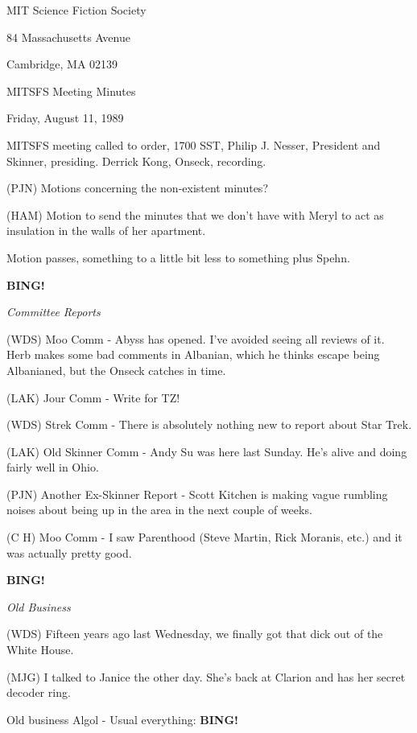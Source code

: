 \documentclass[12pt]{article}
\newcommand{\bing}{{\bf BING!} }
\newcommand{\goto}[1]{\bing \vskip 12pt \centerline{{\em{#1}}}}
\begin{document}
\begin{center}

MIT Science Fiction Society 

84 Massachusetts Avenue

Cambridge, MA 02139

\vspace{12pt}

MITSFS Meeting Minutes 

Friday, August 11, 1989

\end{center}
 
\vspace{18pt}

\setlength{\parskip}{6pt}

\noindent
MITSFS meeting called to order, 1700 SST, Philip J. Nesser, President and Skinner, presiding. Derrick Kong, Onseck, recording.

(PJN) Motions concerning the non-existent minutes?

(HAM) Motion to send the minutes that we don't have with Meryl to act as insulation in the walls of her apartment.

Motion passes, something to a little bit less to something plus Spehn.

\goto{Committee Reports}

(WDS) Moo Comm - Abyss has opened.  I've avoided seeing all reviews of it. Herb makes some bad comments in Albanian, which he thinks escape being Albanianed, but the Onseck catches in time.

(LAK) Jour Comm - Write for TZ!

(WDS) Strek Comm - There is absolutely nothing new to report about Star Trek.

(LAK) Old Skinner Comm - Andy Su was here last Sunday.  He's alive and doing fairly well in Ohio.

(PJN) Another Ex-Skinner Report - Scott Kitchen is making vague rumbling noises about being up in the area in the next couple of weeks.

(C H) Moo Comm - I saw Parenthood (Steve Martin, Rick Moranis, etc.) and it was actually pretty good.

\goto{Old Business}

(WDS) Fifteen years ago last Wednesday, we finally got that dick out of the White House.

(MJG) I talked to Janice the other day.  She's back at Clarion and has her secret decoder ring.

Old business Algol - Usual everything: \bing
\end{document}
